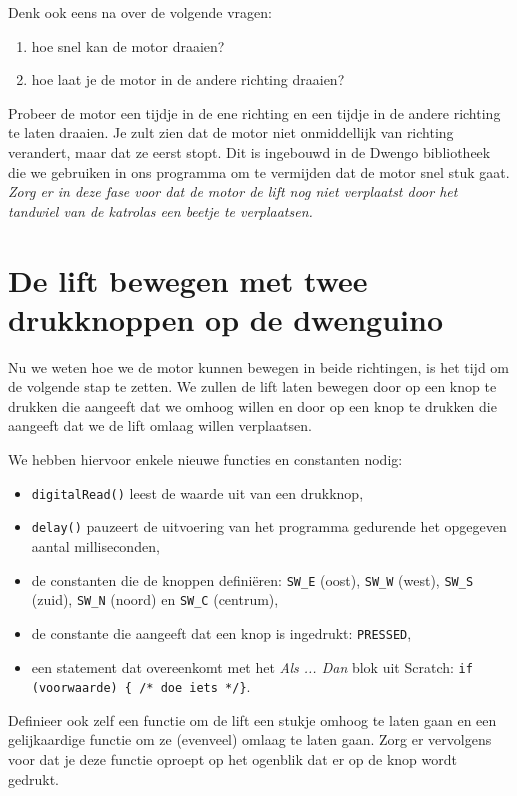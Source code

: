 \documentclass[a4paper, 10pt]{article}
\begin{document}
Denk ook eens na over de volgende vragen:

\begin{enumerate}
\item hoe snel kan de motor draaien?
\item hoe laat je de motor in de andere richting draaien?
\end{enumerate}

Probeer de motor een tijdje in de ene richting en een tijdje in de andere richting te laten draaien. Je zult zien dat
de motor niet onmiddellijk van richting verandert, maar dat ze eerst stopt. Dit is ingebouwd in de Dwengo bibliotheek
die we gebruiken in ons programma om te vermijden dat de motor snel stuk gaat. {\em Zorg er in deze fase voor dat de motor de
lift nog niet verplaatst door het tandwiel van de katrolas een beetje te verplaatsen.}

\section{De lift bewegen met twee drukknoppen op de dwenguino}

Nu we weten hoe we de motor kunnen bewegen in beide richtingen, is het tijd om de volgende stap te zetten. We zullen
de lift laten bewegen door op een knop te drukken die aangeeft dat we omhoog willen en door op een knop te drukken
die aangeeft dat we de lift omlaag willen verplaatsen.

We hebben hiervoor enkele nieuwe functies en constanten nodig:

\begin{itemize}
\item \texttt{digitalRead()} leest de waarde uit van een drukknop,
\item \texttt{delay()} pauzeert de uitvoering van het programma gedurende het opgegeven aantal milliseconden,
\item de constanten die de knoppen defini\"eren: \texttt{SW\_E} (oost), \texttt{SW\_W} (west), \texttt{SW\_S} (zuid), \texttt{SW\_N} (noord) en \texttt{SW\_C} (centrum),
\item de constante die aangeeft dat een knop is ingedrukt: \texttt{PRESSED},
\item een statement dat overeenkomt met het {\em Als ... Dan} blok uit Scratch: \texttt{if (voorwaarde) \{ /* doe iets */\}}.
\end{itemize}

Definieer ook zelf een functie om de lift een stukje omhoog te laten gaan en een gelijkaardige functie om ze (evenveel)
omlaag te laten gaan. Zorg er vervolgens voor dat je deze functie oproept op het ogenblik dat er op de knop wordt
gedrukt.
\end{document}
